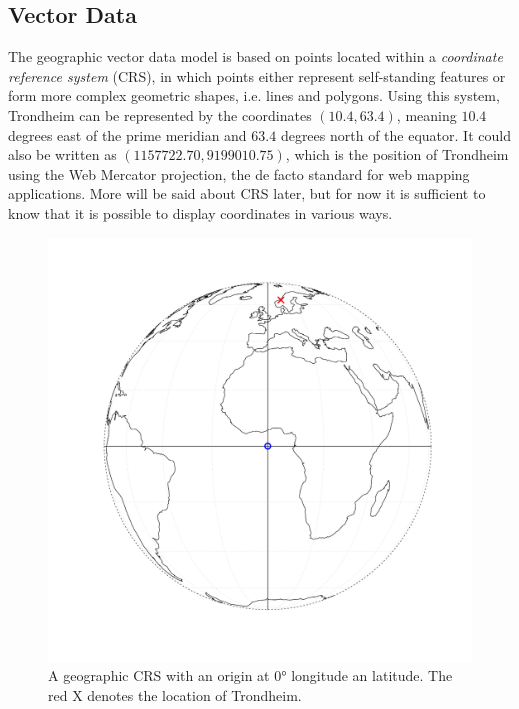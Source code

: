 \subsection{Vector Data}
The geographic vector data model is based on points located within a \textit{coordinate reference system} (CRS), in which points either represent self-standing features or form more complex geometric shapes, i.e. lines and polygons. Using this system, Trondheim can be represented by the coordinates $\left(10.4, 63.4\right)$, meaning $10.4$ degrees east of the prime meridian and $63.4$ degrees north of the equator. It could also be written as $\left(1157722.70, 9199010.75\right)$, which is the position of Trondheim using the Web Mercator projection, the de facto standard for web mapping applications. More will be said about CRS later, but for now it is sufficient to know that it is possible to display coordinates in various ways.
\begin{figure}[H]
   \centering
       \includegraphics[page=1,width=.7\textwidth]{globe.pdf}
 \caption{A geographic CRS with an origin at 0° longitude an latitude. The red X denotes the location of Trondheim.}
 \label{fig:globe}
\end{figure}
